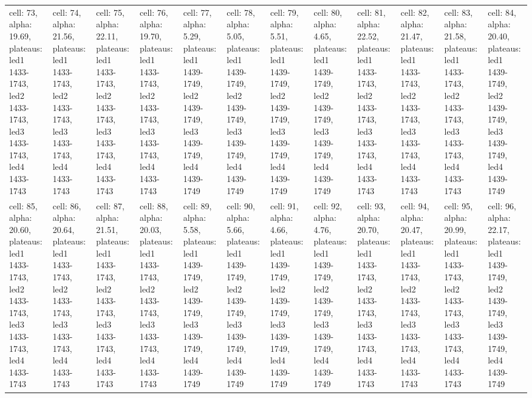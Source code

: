 \begin{landscape}
\begin{longtable}{|l|l|l|l|l|l|l|l|l|l|l|l|}
\rowcolor{lightgray} cell: 73, alpha: 19.69, plateaus: led1 1433-1743, led2 1433-1743, led3 1433-1743, led4 1433-1743 &cell: 74, alpha: 21.56, plateaus: led1 1433-1743, led2 1433-1743, led3 1433-1743, led4 1433-1743 &cell: 75, alpha: 22.11, plateaus: led1 1433-1743, led2 1433-1743, led3 1433-1743, led4 1433-1743 &cell: 76, alpha: 19.70, plateaus: led1 1433-1743, led2 1433-1743, led3 1433-1743, led4 1433-1743 &cell: 77, alpha: 5.29, plateaus: led1 1439-1749, led2 1439-1749, led3 1439-1749, led4 1439-1749 &cell: 78, alpha: 5.05, plateaus: led1 1439-1749, led2 1439-1749, led3 1439-1749, led4 1439-1749 &cell: 79, alpha: 5.51, plateaus: led1 1439-1749, led2 1439-1749, led3 1439-1749, led4 1439-1749 &cell: 80, alpha: 4.65, plateaus: led1 1439-1749, led2 1439-1749, led3 1439-1749, led4 1439-1749 &cell: 81, alpha: 22.52, plateaus: led1 1433-1743, led2 1433-1743, led3 1433-1743, led4 1433-1743 &cell: 82, alpha: 21.47, plateaus: led1 1433-1743, led2 1433-1743, led3 1433-1743, led4 1433-1743 &cell: 83, alpha: 21.58, plateaus: led1 1433-1743, led2 1433-1743, led3 1433-1743, led4 1433-1743 &cell: 84, alpha: 20.40, plateaus: led1 1439-1749, led2 1439-1749, led3 1439-1749, led4 1439-1749 \\
cell: 85, alpha: 20.60, plateaus: led1 1433-1743, led2 1433-1743, led3 1433-1743, led4 1433-1743 &cell: 86, alpha: 20.64, plateaus: led1 1433-1743, led2 1433-1743, led3 1433-1743, led4 1433-1743 &cell: 87, alpha: 21.51, plateaus: led1 1433-1743, led2 1433-1743, led3 1433-1743, led4 1433-1743 &cell: 88, alpha: 20.03, plateaus: led1 1433-1743, led2 1433-1743, led3 1433-1743, led4 1433-1743 &cell: 89, alpha: 5.58, plateaus: led1 1439-1749, led2 1439-1749, led3 1439-1749, led4 1439-1749 &cell: 90, alpha: 5.66, plateaus: led1 1439-1749, led2 1439-1749, led3 1439-1749, led4 1439-1749 &cell: 91, alpha: 4.66, plateaus: led1 1439-1749, led2 1439-1749, led3 1439-1749, led4 1439-1749 &cell: 92, alpha: 4.76, plateaus: led1 1439-1749, led2 1439-1749, led3 1439-1749, led4 1439-1749 &cell: 93, alpha: 20.70, plateaus: led1 1433-1743, led2 1433-1743, led3 1433-1743, led4 1433-1743 &cell: 94, alpha: 20.47, plateaus: led1 1433-1743, led2 1433-1743, led3 1433-1743, led4 1433-1743 &cell: 95, alpha: 20.99, plateaus: led1 1433-1743, led2 1433-1743, led3 1433-1743, led4 1433-1743 &cell: 96, alpha: 22.17, plateaus: led1 1439-1749, led2 1439-1749, led3 1439-1749, led4 1439-1749 \\

\end{longtable}
\end{landscape}
